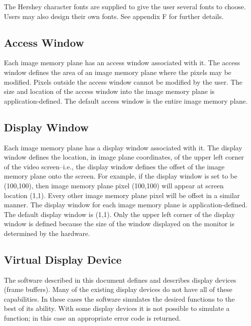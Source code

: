 The Hershey character fonts are supplied to give the user several
fonts to choose.  Users may also design their own fonts.  See
appendix F for further details.
\subsection{Access Window}
Each image memory plane has an access window associated with it.  The
access window defines the area of an image memory plane where the
pixels may be modified.  Pixels outside the access window cannot be
modified by the user.  The size and location of the access window into
the image memory plane is application-defined.  The default access window
is the entire image memory plane.
\subsection{Display Window}
Each image memory plane has a display window associated with it.  The
display window defines the location, in image plane coordinates, of the
upper left corner of the video screen--i.e., the display window
defines the offset of the image memory plane onto the screen.  For example,
if the display window is set to be (100,100), then image memory plane
pixel (100,100) will appear at screen location (1,1).  Every other
image memory plane pixel will be offset in a similar manner.  The display
window for each image memory plane is application-defined.  The default
display window is (1,1).  Only the upper left corner of the display
window is defined because the size of the window displayed on the monitor
is determined by the hardware.
\subsection{Virtual Display Device}
The software described in this document defines and describes display devices
(frame buffers).  Many of the existing display devices do not have all
of these capabilities.  In these cases the software simulates the
desired functions to the best of its ability.  With some display
devices it is not possible to simulate a function; in this case
an appropriate error code is returned.

